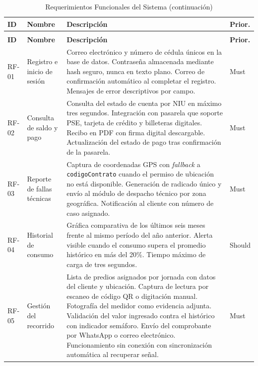 \documentclass[12pt, a4paper]{article}
\begin{document}
\begin{longtable}{p{1.2cm} p{3cm} p{9cm} p{1.5cm}}
  \caption{Requerimientos Funcionales del Sistema} \\
  \toprule
  \textbf{ID} & \textbf{Nombre} & \textbf{Descripción} & \textbf{Prior.} \\
  \midrule
  \endfirsthead
  \caption[]{Requerimientos Funcionales del Sistema (continuación)} \\
  \toprule
  \textbf{ID} & \textbf{Nombre} & \textbf{Descripción} & \textbf{Prior.} \\
  \midrule
  \endhead
  \bottomrule
  \endfoot

  RF-01 & Registro e inicio de sesión &
    Correo electrónico y número de cédula únicos en la base de datos.
    Contraseña almacenada mediante hash seguro, nunca en texto plano.
    Correo de confirmación automático al completar el registro.
    Mensajes de error descriptivos por campo. &
    Must \\[4pt]

  RF-02 & Consulta de saldo y pago &
    Consulta del estado de cuenta por NIU en máximo tres segundos.
    Integración con pasarela que soporte PSE, tarjeta de crédito y billeteras digitales.
    Recibo en PDF con firma digital descargable.
    Actualización del estado de pago tras confirmación de la pasarela. &
    Must \\[4pt]

  RF-03 & Reporte de fallas técnicas &
    Captura de coordenadas GPS con \textit{fallback} a \texttt{codigoContrato} cuando el permiso de ubicación no está disponible.
    Generación de radicado único y envío al módulo de despacho técnico por zona geográfica.
    Notificación al cliente con número de caso asignado. &
    Must \\[4pt]

  RF-04 & Historial de consumo &
    Gráfica comparativa de los últimos seis meses frente al mismo período del año anterior.
    Alerta visible cuando el consumo supera el promedio histórico en más del 20\%.
    Tiempo máximo de carga de tres segundos. &
    Should \\[4pt]

  RF-05 & Gestión del recorrido &
    Lista de predios asignados por jornada con datos del cliente y ubicación.
    Captura de lectura por escaneo de código QR o digitación manual.
    Fotografía del medidor como evidencia adjunta.
    Validación del valor ingresado contra el histórico con indicador semáforo.
    Envío del comprobante por WhatsApp o correo electrónico.
    Funcionamiento sin conexión con sincronización automática al recuperar señal. &
    Must \\
\end{longtable}
\end{document}

